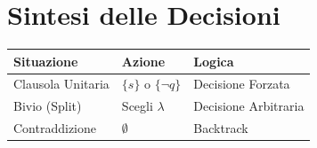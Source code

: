 \documentclass[12pt,a4paper]{article}
\begin{document}
\section{Sintesi delle Decisioni}
\begin{table}[h!]
    \centering
    \begin{tabular}{lll}
        \toprule
        \textbf{Situazione} & \textbf{Azione} & \textbf{Logica} \\
        \midrule
        Clausola Unitaria & $\{s\}$ o $\{\neg q\}$ & Decisione Forzata \\
        Bivio (Split) & Scegli $\lambda$ & Decisione Arbitraria \\
        Contraddizione & $\emptyset$ & Backtrack \\
        \bottomrule
    \end{tabular}
\end{table}
\end{document}
